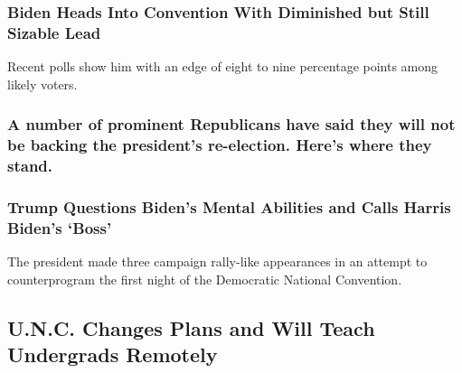 \hypertarget{biden-heads-into-convention-with-diminished-but-still-sizable-lead}{%
\subsubsection{Biden Heads Into Convention With Diminished but Still
Sizable
Lead}\label{biden-heads-into-convention-with-diminished-but-still-sizable-lead}}

\href{https://www.nytimes3xbfgragh.onion/2020/08/17/upshot/polls-2020-election-convention.html}{}

Recent polls show him with an edge of eight to nine percentage points
among likely voters.

\href{https://www.nytimes3xbfgragh.onion/article/republicans-voting-for-biden-not-trump.html}{}

\hypertarget{a-number-of-prominent-republicans-have-said-they-will-not-be-backing-the-presidents-re-election-heres-where-they-stand}{%
\subsubsection{A number of prominent Republicans have said they will not
be backing the president's re-election. Here's where they
stand.}\label{a-number-of-prominent-republicans-have-said-they-will-not-be-backing-the-presidents-re-election-heres-where-they-stand}}

\href{https://www.nytimes3xbfgragh.onion/2020/08/17/us/politics/trump-campaign-biden-harris.html}{}

\hypertarget{trump-questions-bidens-mental-abilities-and-calls-harris-bidens-boss}{%
\subsubsection{Trump Questions Biden's Mental Abilities and Calls Harris
Biden's
`Boss'}\label{trump-questions-bidens-mental-abilities-and-calls-harris-bidens-boss}}

\href{https://www.nytimes3xbfgragh.onion/2020/08/17/us/politics/trump-campaign-biden-harris.html}{}

The president made three campaign rally-like appearances in an attempt
to counterprogram the first night of the Democratic National Convention.

\href{/2020/08/17/world/coronavirus-covid.html}{}

\hypertarget{unc-changes-plans-and-will-teach-undergrads-remotely}{%
\subsection{U.N.C. Changes Plans and Will Teach Undergrads
Remotely}\label{unc-changes-plans-and-will-teach-undergrads-remotely}}

